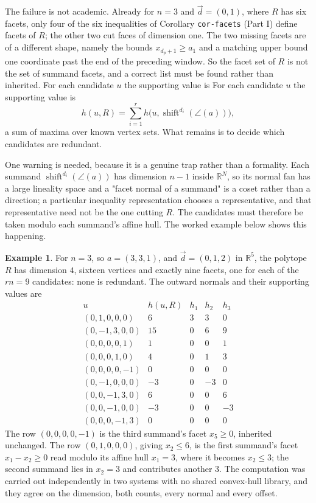 \documentclass[11pt, a4paper, abstract=yes]{scrartcl}
\theoremstyle{definition}
\newtheorem{mexample}[definition]{Example}
\theoremstyle{remark}
\theoremstyle{plain}
\newcommand{\shift}{\operatorname{shift}}
\begin{document}
The failure is not academic. Already for \(n=3\) and \(\vec d=(0,1)\), where \(R\) has six facets, only
four of the six inequalities of Corollary \texttt{cor-facets} (Part I) define facets of \(R\); the other two cut faces
of dimension one. The two missing facets are of a different shape, namely the bounds
\(x_{d_p+1}\ge a_1\) and a matching upper bound one coordinate past the end of the preceding window.
So the facet set of \(R\) is not the set of summand facets, and a correct list must be found rather
than inherited. For each candidate \(u\) the supporting value is For each candidate \(u\) the supporting value is
\[
  h(u,R)=\sum_{i=1}^{r} h\bigl(u,\shift^{d_i}(\angle(a))\bigr),
\]
a sum of maxima over known vertex sets. What remains is to decide which candidates are redundant.

One warning is needed, because it is a genuine trap rather than a formality. Each summand
\(\shift^{d_i}(\angle(a))\) has dimension \(n-1\) inside \(\mathbb R^N\), so its normal fan has a
large lineality space and a "facet normal of a summand" is a coset rather than a direction; a
particular inequality representation chooses a representative, and that representative need not be
the one cutting \(R\). The candidates must therefore be taken modulo each summand's affine hull. The
worked example below shows this happening.

\begin{mexample}
For \(n=3\), so \(a=(3,3,1)\), and \(\vec d=(0,1,2)\) in \(\mathbb R^5\), the polytope \(R\) has
dimension \(4\), sixteen vertices and exactly nine facets, one for each of the \(rn=9\) candidates:
none is redundant. The outward normals and their supporting values are
\[
  \begin{array}{lrrrr}
    u & h(u,R) & h_1 & h_2 & h_3\\[2pt]
    (0,1,0,0,0)   & 6   & 3 & 3 & 0\\
    (0,-1,3,0,0)  & 15  & 0 & 6 & 9\\
    (0,0,0,0,1)   & 1   & 0 & 0 & 1\\
    (0,0,0,1,0)   & 4   & 0 & 1 & 3\\
    (0,0,0,0,-1)  & 0   & 0 & 0 & 0\\
    (0,-1,0,0,0)  & -3  & 0 & -3& 0\\
    (0,0,-1,3,0)  & 6   & 0 & 0 & 6\\
    (0,0,-1,0,0)  & -3  & 0 & 0 & -3\\
    (0,0,0,-1,3)  & 0   & 0 & 0 & 0
  \end{array}
\]
The row \((0,0,0,0,-1)\) is the third summand's facet \(x_5\ge0\), inherited unchanged. The row
\((0,1,0,0,0)\), giving \(x_2\le6\), is the first summand's facet \(x_1-x_2\ge0\) read modulo its
affine hull \(x_1=3\), where it becomes \(x_2\le3\); the second summand lies in \(x_2=3\) and
contributes another \(3\). The computation was carried out independently in two systems with no
shared convex-hull library, and they agree on the dimension, both counts, every normal and every
offset.
\label{org0ea5801}
\end{mexample}
\end{document}
